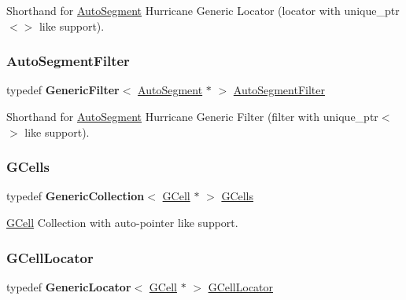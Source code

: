 Shorthand for \hyperlink{classKatabatic_1_1AutoSegment}{Auto\+Segment} Hurricane Generic Locator (locator with {\ttfamily unique\+\_\+ptr$<$$>$} like support). \mbox{\label{namespaceKatabatic_a13ffc994c98e1a878e61a927de0509c8}} 
\subsubsection{\texorpdfstring{Auto\+Segment\+Filter}{AutoSegmentFilter}}
{\footnotesize\ttfamily typedef \textbf{ Generic\+Filter}$<$ \hyperlink{classKatabatic_1_1AutoSegment}{Auto\+Segment} $\ast$ $>$ \hyperlink{namespaceKatabatic_a13ffc994c98e1a878e61a927de0509c8}{Auto\+Segment\+Filter}}

Shorthand for \hyperlink{classKatabatic_1_1AutoSegment}{Auto\+Segment} Hurricane Generic Filter (filter with {\ttfamily unique\+\_\+ptr$<$$>$} like support). \mbox{\label{namespaceKatabatic_ab68f9dfbbc79fd999773beef8561bc31}} 
\subsubsection{\texorpdfstring{G\+Cells}{GCells}}
{\footnotesize\ttfamily typedef \textbf{ Generic\+Collection}$<$ \hyperlink{classKatabatic_1_1GCell}{G\+Cell} $\ast$ $>$ \hyperlink{namespaceKatabatic_ab68f9dfbbc79fd999773beef8561bc31}{G\+Cells}}

\hyperlink{classKatabatic_1_1GCell}{G\+Cell} Collection with auto-\/pointer like support. \mbox{\label{namespaceKatabatic_ae192ef170a0ad390902e435ac1e6796a}} 
\subsubsection{\texorpdfstring{G\+Cell\+Locator}{GCellLocator}}
{\footnotesize\ttfamily typedef \textbf{ Generic\+Locator}$<$ \hyperlink{classKatabatic_1_1GCell}{G\+Cell} $\ast$ $>$ \hyperlink{namespaceKatabatic_ae192ef170a0ad390902e435ac1e6796a}{G\+Cell\+Locator}}

